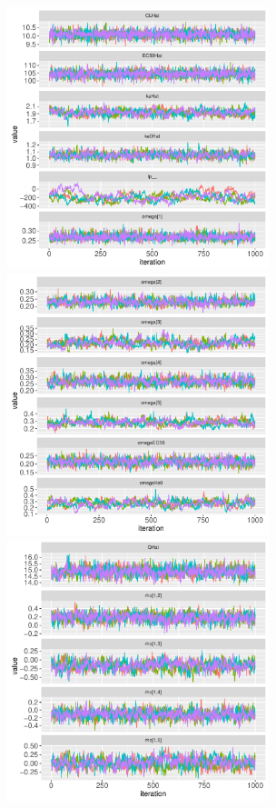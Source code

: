 \documentclass[10pt, reqno, oneside]{amsbook}
\numberwithin{equation}{chapter}
\numberwithin{figure}{chapter}
\numberwithin{table}{chapter}
\theoremstyle{remark}
\begin{document}
\begin{figure}[!htb]
  \includegraphics[width=3.0in,trim=0in 0in 0 0in]{graphics/effCptModelTorsten_0.82/effCptPlots001.pdf}
  \includegraphics[width=3.0in,trim=0in 0in 0 0in]{graphics/effCptModelTorsten_0.82/effCptPlots002.pdf}
  \includegraphics[width=3.0in,trim=0in 0in 0 0in]{graphics/effCptModelTorsten_0.82/effCptPlots003.pdf}

\end{figure}
\end{document}

